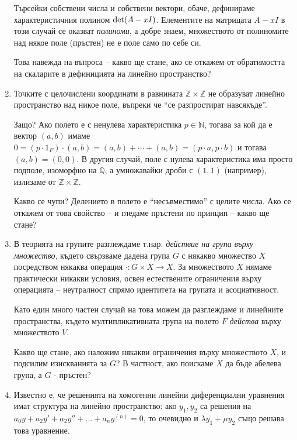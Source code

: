 \documentclass{article}
\newif\ifusemulticols
\theoremstyle{definition}
\theoremstyle{remark}
\theoremstyle{plain}
\theoremstyle{plain}
\newenvironment{mymulticols}
    { \ifusemulticols \begin{multicols}{2} \fi }
    { \ifusemulticols \end{multicols} \fi }
\newcommand{\N}{\mathbb{N}}
\newcommand{\Z}{\mathbb{Z}}
\begin{document}
\begin{mymulticols}
\begin{enumerate}
        Търсейки собствени числа и собствени вектори, обаче, дефинираме характеристичния полином
        $\textnormal{det}(A - xI)$. Елементите на матрицата $A-xI$ в този случай се оказват
        \textit{полиноми}, а добре знаем, множеството от полиномите над някое поле (пръстен) не е
        поле само по себе си.

        Това навежда на въпроса -- какво ще стане, ако се откажем от обратимостта на скаларите в
        дефиницията на линейно пространство?

    \item Точките с целочислени координати в равнината $\Z \times \Z$ не образуват
        линейно пространство над никое поле, въпреки че ``се разпростират навсякъде''.

        Защо? Ако полето е с ненулева характеристика $p \in \N$, тогава за кой да е вектор $(a, b)$
        имаме $0 = (p \cdot 1_F) \cdot (a, b) = (a, b) + \cdots + (a, b) = (p \cdot a, p \cdot b)$ и
        тогава $(a, b) = (0, 0)$.  В другия случай, поле с нулева характеристика има просто подполе,
        изоморфно на $\mathbb Q$, а умножавайки дроби с $(1,1)$ (например), излизаме от $\Z
        \times \Z$.

        Какво се чупи? Делението в полето е ``несъвместимо'' с целите числа.
        Ако се откажем от това свойство -- и гледаме пръстени по принцип -- какво ще стане?

    \item В теорията на групите разглеждаме т.нар. \textit{действие на група върху множество},
        където свързваме дадена група $G$ с някакво множество $X$ посредством някаква операция
        $\cdot : G \times X \to X$. За множеството $X$ нямаме практически никакви условия, освен
        естествените ограничения върху операцията -- неутралност спрямо идентитета на групата и
        асоциативност.

        Като един много частен случай на това можем да разглеждаме и линейните пространства, където
        мултипликативната група на полето $F$ \textit{действа} върху множеството $V$.

        Какво ще стане, ако наложим някакви ограничения върху множеството $X$, и подсилим
        изискванията за $G$? В частност, ако поискаме $X$ да бъде абелева група, а $G$ - пръстен?

    \item Известно е, че решенията на хомогенни линейни диференциални уравнения имат структура на
        линейно пространство: ако $y_1, y_2$ са решения на $a_0y+a_2y' + a_2y'' + \ldots + a_n
        y^{(n)} = 0$, то очевидно и $\lambda y_1 + \mu y_2$ също решава това уравнение.


\end{enumerate}
\end{mymulticols}
\end{document}
